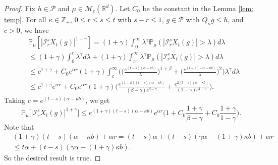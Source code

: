 \documentclass[EJP]{ejpecp} %
\begin{document}
\begin{proof}
	Fix $h \in \mathcal P$ and $\mu \in \mathcal M_c(\mathbb R^d)$. Let $C_0$ be the constant in the Lemma \ref{lem: temp}.
	For all $\kappa \in \mathbb Z_+$,  $0\leq r\leq s\leq t$ with $s-r \leq 1$,  $g\in \mathcal P$ with $Q_{\kappa} g \leq h$, and $c>0$, we have
\begin{align}
   	& \mathbb P_\mu[|\mathcal I_r^sX_t(g)|^{1+\gamma}]
   	= (1+\gamma)\int_0^\infty \lambda^{\gamma} \mathbb P_{\mu}(|\mathcal I_r^sX_t(g)|>\lambda) d\lambda \\
  	& \leq (1+\gamma)\int_0^c \lambda^{\gamma} d\lambda +(1+\gamma)\int_c^\infty \lambda^{\gamma}\mathbb P_\mu(|\mathcal I_r^sX_t(g)|> \lambda) d\lambda \\
    & \leq c^{1+\gamma} + C_0  e^{\alpha r}(1+\gamma)\int_c^\infty \bigg(\Big(\frac{e^{(t-s)(\alpha - \kappa b)}}{\lambda}\Big)^{1+\beta}+\Big(\frac{e^{(t-s)(\alpha - \kappa b)}}{\lambda}\Big)^{2}\bigg)\lambda^{\gamma}d\lambda \\
    & \leq c^{1+\gamma} e^{\alpha r} + C_0e^{\alpha r}(1+\gamma)\Big(  \frac{e^{(1+\beta)(t-s)(\alpha- \kappa b)}}{(\beta - \gamma)c^{\beta - \gamma}}  + \frac{e^{2(t-s)(\alpha- \kappa b)}}{(1 - \gamma)c^{1 - \gamma}} \Big).
\end{align}
	Taking $c = e^{(t-s)(\alpha- \kappa b)}$, we get
\begin{equation}
	\mathbb P_\mu\big[|\mathcal I_r^s X_t(g)|^{1+\gamma}\big]
  	\leq e^{(1+\gamma)(t-s)(\alpha- \kappa b)} e^{\alpha r}\Big(1+ C_0 \frac{1+\gamma}{\beta - \gamma}+ C_0 \frac{1+\gamma}{1 - \gamma}\Big).
\end{equation}
	Note that
\begin{align}
    & (1+\gamma) (t-s) (\alpha- \kappa b) + \alpha r
    = (t-s)\alpha+(t-s) (\gamma \alpha- (1+\gamma )\kappa b)+\alpha r \\
    & \leq t\alpha+(t-s) (\gamma \alpha- (1+\gamma)\kappa b).
\end{align}
	So the desired result is true.
\end{proof}
\end{document}
